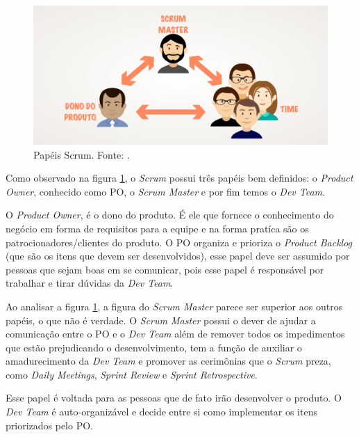 \begin{figure}[H]
	\centering
	\includegraphics[width=1.0\textwidth]{figuras/papeis_scrum.png}
	\caption{Papéis Scrum. Fonte: .}
	\label{img:papeis_scrum}
\end{figure}

Como observado na figura \ref{img:papeis_scrum}, o \textit{Scrum} possui três papéis bem definidos: o \textit{Product Owner}, conhecido como PO, o \textit{Scrum Master} e por fim temos o \textit{Dev Team}. 


O \textit{Product Owner}, é o dono do produto. É ele que fornece o conhecimento do negócio em forma de requisitos para a equipe e na forma pratíca são os patrocionadores/clientes do produto. O PO organiza e prioriza o \textit{Product Backlog} (que são os itens que devem ser desenvolvidos), esse papel deve ser assumido por pessoas que sejam boas em se comunicar, pois esse papel é responsável por trabalhar e tirar dúvidas da \textit{Dev Team}.


Ao analisar a figura \ref{img:papeis_scrum}, a figura do \textit{Scrum Master} parece ser superior aos outros papéis, o que não é verdade. O \textit{Scrum Master} possui o dever de ajudar a comunicação entre o PO e o \textit{Dev Team} além de remover todos os impedimentos que estão prejudicando o desenvolvimento, tem a função de auxiliar o amadurecimento da \textit{Dev Team} e promover as cerimônias que o \textit{Scrum} preza, como \textit{Daily Meetings}, \textit{Sprint Review} e \textit{Sprint Retrospective}.


Esse papel é voltada para as pessoas que de fato irão desenvolver o produto. O \textit{Dev Team} é auto-organizável e decide entre si como implementar os itens priorizados pelo PO.

